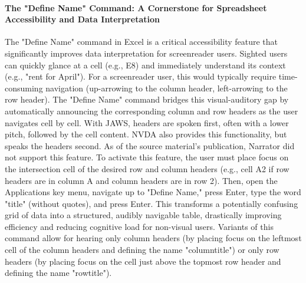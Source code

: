 \paragraph{The "Define Name" Command: A Cornerstone for Spreadsheet Accessibility and Data Interpretation}
The "Define Name" command in Excel is a critical accessibility feature that significantly improves data interpretation for screenreader users. Sighted users can quickly glance at a cell (e.g., E8) and immediately understand its context (e.g., "rent for April"). For a screenreader user, this would typically require time-consuming navigation (up-arrowing to the column header, left-arrowing to the row header).\supercite{kingsbury2025} The "Define Name" command bridges this visual-auditory gap by automatically announcing the corresponding column and row headers as the user navigates cell by cell. With JAWS, headers are spoken first, often with a lower pitch, followed by the cell content. NVDA also provides this functionality, but speaks the headers second. As of the source material's publication, Narrator did not support this feature.\supercite{kingsbury2025}
To activate this feature, the user must place focus on the intersection cell of the desired row and column headers (e.g., cell A2 if row headers are in column A and column headers are in row 2). Then, open the Applications key menu, navigate up to "Define Name," press Enter, type the word "title" (without quotes), and press Enter.\supercite{kingsbury2025} This transforms a potentially confusing grid of data into a structured, audibly navigable table, drastically improving efficiency and reducing cognitive load for non-visual users. Variants of this command allow for hearing only column headers (by placing focus on the leftmost cell of the column headers and defining the name "columntitle") or only row headers (by placing focus on the cell just above the topmost row header and defining the name "rowtitle").\supercite{kingsbury2025}
